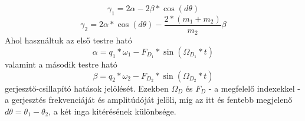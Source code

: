 \begin{equation}
    \gamma_{1}
    =
    2 \alpha - 2 \beta * \cos{\left( d \theta \right)}
\end{equation}
\begin{equation}
    \gamma_{2}
    =
    2 \alpha * \cos{\left( d \theta \right)}
    -
    \frac{2 * \left( m_{1} + m_{2} \right)}{m_{2}} \beta
\end{equation}
Ahol használtuk az első testre ható
\begin{equation}
    \alpha
    =
    q_{1} * \omega_{1}
    -
    F_{D_{1}} * \sin{\left( \Omega_{D_{1}} * t \right)}
\end{equation}
valamint a második testre ható
\begin{equation}
    \beta
    =
    q_{2} * \omega_{2}
    -
    F_{D_{2}} * \sin{\left( \Omega_{D_{2}} * t \right)}
\end{equation}
gerjesztő-csillapító hatások jelölését. Ezekben $\Omega_{D}$ és $F_{D}$ - a megfelelő indexekkel - a gerjesztés frekvenciáját és amplitúdóját jelöli, míg az itt és fentebb megjelenő $d \theta = \theta_{1} - \theta_{2}$, a két inga kitérésének különbsége.